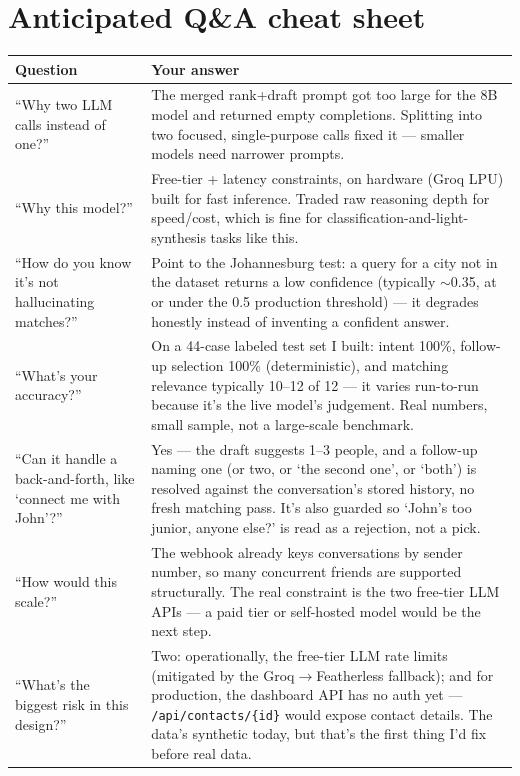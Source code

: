 \documentclass[11pt, a4paper]{article}
\begin{document}
\section{Anticipated Q\&A cheat sheet}
\label{sec:qa}

\begin{longtable}{@{}p{6.5cm}p{9.5cm}@{}}
\toprule
Question & Your answer \\
\midrule
\endhead
``Why two LLM calls instead of one?'' & The merged rank+draft prompt got too large for the 8B model and returned empty completions. Splitting into two focused, single-purpose calls fixed it --- smaller models need narrower prompts. \\
``Why this model?'' & Free-tier + latency constraints, on hardware (Groq LPU) built for fast inference. Traded raw reasoning depth for speed/cost, which is fine for classification-and-light-synthesis tasks like this. \\
``How do you know it's not hallucinating matches?'' & Point to the Johannesburg test: a query for a city not in the dataset returns a low confidence (typically $\sim$0.35, at or under the 0.5 production threshold) --- it degrades honestly instead of inventing a confident answer. \\
``What's your accuracy?'' & On a 44-case labeled test set I built: intent 100\%, follow-up selection 100\% (deterministic), and matching relevance typically 10--12 of 12 --- it varies run-to-run because it's the live model's judgement. Real numbers, small sample, not a large-scale benchmark. \\
``Can it handle a back-and-forth, like `connect me with John'?'' & Yes --- the draft suggests 1--3 people, and a follow-up naming one (or two, or `the second one', or `both') is resolved against the conversation's stored history, no fresh matching pass. It's also guarded so `John's too junior, anyone else?' is read as a rejection, not a pick. \\
``How would this scale?'' & The webhook already keys conversations by sender number, so many concurrent friends are supported structurally. The real constraint is the two free-tier LLM APIs --- a paid tier or self-hosted model would be the next step. \\
``What's the biggest risk in this design?'' & Two: operationally, the free-tier LLM rate limits (mitigated by the Groq$\to$Featherless fallback); and for production, the dashboard API has no auth yet --- \texttt{/api/contacts/\{id\}} would expose contact details. The data's synthetic today, but that's the first thing I'd fix before real data. \\

\end{longtable}
\end{document}
